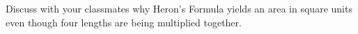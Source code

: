 { Discuss with your classmates why Heron's Formula yields an area in square units even though four lengths are being multiplied together.}
{}
